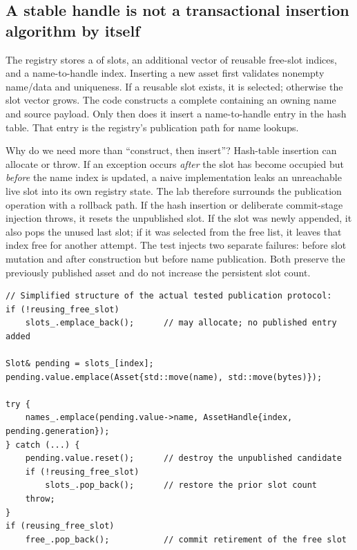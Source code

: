 \subsection{A stable handle is not a transactional insertion algorithm by itself}\label{05-engine-i-ch005-a-stable-handle-is-not-a-transactional-insertion-algorithm-by-itself}

\hypertarget{05-engine-i-ch005-a-stable-handle-is-not-a-transactional-insertion-algorithm-by-itself}{}

The registry stores a  of slots, an additional vector of reusable free-slot indices, and a name-to-handle index. Inserting a new asset first validates nonempty name/data and uniqueness. If a reusable slot exists, it is selected; otherwise the slot vector grows. The code constructs a complete  containing an owning  name and  source payload. Only then does it insert a name-to-handle entry in the hash table. That entry is the registry's publication path for name lookups.

Why do we need more than ``construct, then insert''? Hash-table insertion can allocate or throw. If an exception occurs \emph{after} the slot has become occupied but \emph{before} the name index is updated, a naive implementation leaks an unreachable live slot into its own registry state. The lab therefore surrounds the publication operation with a rollback path. If the hash insertion or deliberate commit-stage injection throws, it resets the unpublished slot. If the slot was newly appended, it also pops the unused last slot; if it was selected from the free list, it leaves that index free for another attempt. The test injects two separate failures: before slot mutation and after construction but before name publication. Both preserve the previously published asset and do not increase the persistent slot count.

\begin{verbatim}
// Simplified structure of the actual tested publication protocol:
if (!reusing_free_slot)
    slots_.emplace_back();      // may allocate; no published entry added

Slot& pending = slots_[index];
pending.value.emplace(Asset{std::move(name), std::move(bytes)});

try {
    names_.emplace(pending.value->name, AssetHandle{index, pending.generation});
} catch (...) {
    pending.value.reset();      // destroy the unpublished candidate
    if (!reusing_free_slot)
        slots_.pop_back();      // restore the prior slot count
    throw;
}
if (reusing_free_slot)
    free_.pop_back();           // commit retirement of the free slot
\end{verbatim}

